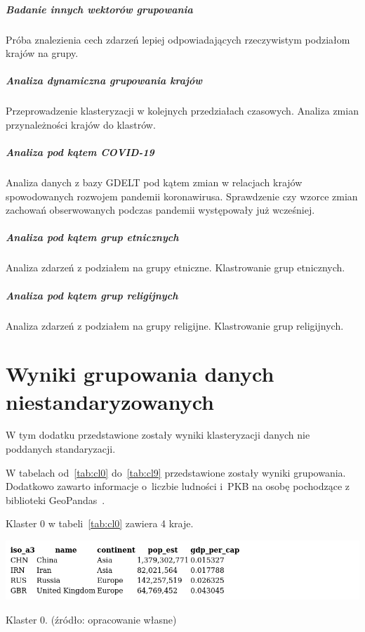 \documentclass[11pt]{report}
\begin{document}
    \paragraph{Badanie innych wektorów grupowania}
    Próba znalezienia cech zdarzeń lepiej odpowiadających rzeczywistym podziałom krajów na grupy.

    \paragraph{Analiza dynamiczna grupowania krajów}
    Przeprowadzenie klasteryzacji w kolejnych przedziałach czasowych.
    Analiza zmian przynależności krajów do klastrów.

    \paragraph{Analiza pod kątem COVID-19}
    Analiza danych z bazy GDELT pod kątem zmian w relacjach krajów spowodowanych rozwojem pandemii koronawirusa.
    Sprawdzenie czy wzorce zmian zachowań obserwowanych podczas pandemii występowały już wcześniej.

    \paragraph{Analiza pod kątem grup etnicznych}
    Analiza zdarzeń z podziałem na grupy etniczne.
    Klastrowanie grup etnicznych.

    \paragraph{Analiza pod kątem grup religijnych}
    Analiza zdarzeń z podziałem na grupy religijne.
    Klastrowanie grup religijnych.

    \appendix
    \newpage


    \chapter[Wyniki grupowania]{Wyniki grupowania danych niestandaryzowanych}\label{ch:dodatek_niestd}
    W tym dodatku przedstawione zostały wyniki klasteryzacji danych nie poddanych standaryzacji.

    W tabelach od~\ref{tab:cl0} do~\ref{tab:cl9} przedstawione zostały wyniki grupowania.
    Dodatkowo zawarto informacje o~liczbie ludności i~PKB na osobę pochodzące z biblioteki GeoPandas~\cite{geopandas}.

    Klaster 0 w tabeli~\ref{tab:cl0} zawiera 4 kraje.
    \begin{table}[!htp]
        \centering
        \includegraphics[width=\linewidth]{tables/CLUST/clust0kmeans.png}
        \caption{Klaster 0. (źródło: opracowanie własne)}
        \label{tab:cl0}
    \end{table}
\end{document}
